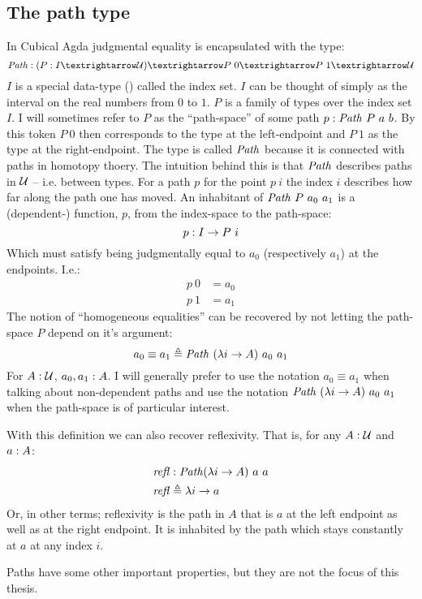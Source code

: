 \subsection{The path type}
In Cubical Agda judgmental equality is encapsulated with the type:
%
$$
\Path \tp (P : I → \MCU) → P\ 0 → P\ 1 → \MCU
$$
%
$I$ is a special data-type () called the index set. $I$ can be thought of simply as the interval on
the real numbers from $0$ to $1$. $P$ is a family of types over the index set
$I$. I will sometimes refer to $P$ as the ``path-space'' of some path $p \mathrel{:}
\mathit{Path}\ P\ a\ b$. By this token $P\ 0$ then corresponds to the type at the
left-endpoint and $P\ 1$ as the type at the right-endpoint. The type is called
$\mathit{Path}$ because it is connected with paths in homotopy thoery. The intuition
behind this is that $\mathit{Path}$ describes paths in $\mathcal{U}$ -- i.e. between types. For
a path $p$ for the point $p\ i$ the index $i$ describes how far along the path
one has moved. An inhabitant of $\mathit{Path}\ P\ a_0\ a_1$ is a (dependent-)
function, $p$, from the index-space to the path-space:
%
$$
p \mathrel{:} I \to P\ i
$$
%
Which must satisfy being judgmentally equal to $a_0$ (respectively $a_1$) at the
endpoints. I.e.:
%
\begin{align*}
  p\ 0 & = a_0 \\
  p\ 1 & = a_1
\end{align*}
%
The notion of ``homogeneous equalities'' can be recovered by not letting the
path-space $P$ depend on it's argument:
%
$$
a_0 \equiv a_1 \mathrel{\triangleq} \mathit{Path}\ (\lambda i \to A)\ a_0\ a_1
$$
%
For $A \mathrel{:} \mathcal{U}$, $a_0, a_1 \mathrel{:} A$. I will generally prefer to use the notation
$a_0 \equiv a_1$ when talking about non-dependent paths and use the notation
$\mathit{Path}\ (\lambda i \to A)\ a_0\ a_1$ when the path-space is of particular
interest.

With this definition we can also recover reflexivity. That is, for any $A \mathrel{:}
\mathcal{U}$ and $a \mathrel{:} A$:
%
\begin{align}
\mathit{refl} & \mathrel{:} \mathit{Path} (\lambda i \to A)\ a\ a \\
\mathit{refl} & \mathrel{\triangleq} \lambda i \to a
\end{align}
%
Or, in other terms; reflexivity is the path in $A$ that is $a$ at the left
endpoint as well as at the right endpoint. It is inhabited by the path which
stays constantly at $a$ at any index $i$.

Paths have some other important properties, but they are not the focus of this
thesis. 
%
